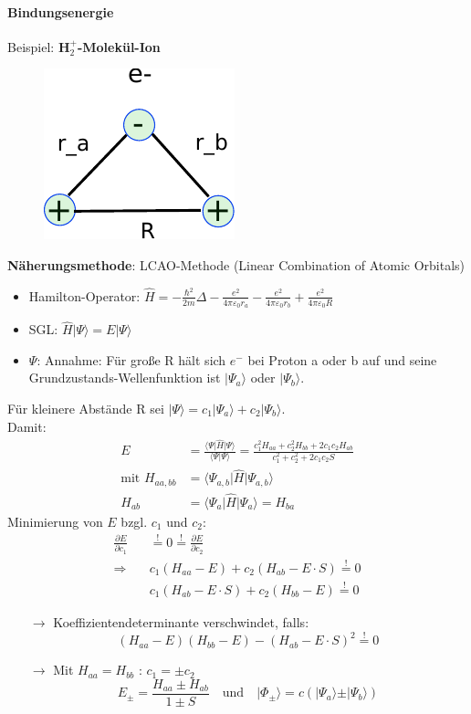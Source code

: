 \paragraph{Bindungsenergie}
Beispiel: \textbf{H$_2^+$-Molekül-Ion}
\begin{figure}[H]
	\centering
	\includegraphics{figures/1_4WasserstoffH2O.pdf}
	\caption{}
	\label{}
\end{figure}
\textbf{Näherungsmethode}: LCAO-Methode (Linear Combination of Atomic Orbitals)
\begin{itemize}
	\item Hamilton-Operator: $\hat H = - \frac{\hbar^2}{2m} \Delta - \frac{e^2}{4 \pi \varepsilon_0 r_a} - \frac{e^2}{4 \pi \varepsilon_0 r_b} +\frac{e^2}{4 \pi \varepsilon_0 R}$
	\item SGL: $\hat H \vert\Psi\rangle = E \vert\Psi\rangle$
	\item $\Psi$: Annahme: Für große R hält sich $e^-$ bei Proton a oder b auf und seine Grundzustands-Wellenfunktion ist $\vert\Psi_a\rangle$ oder $\vert\Psi_b\rangle$.\\
\end{itemize}
Für kleinere Abstände R sei $\vert\Psi\rangle = c_1 \vert\Psi_a\rangle + c_2 \vert\Psi_b\rangle$. \\
Damit:
\begin{align*}
	E &= \frac{\langle\Psi\vert\hat{H}\vert\Psi\rangle}{\langle\Psi\vert\Psi\rangle} = \frac{c_1^2 H_{aa} + c_2^2 H_{bb} + 2 c_1 c_2 H_{ab}}{c_1^2 + c_2^2 + 2 c_1 c_2 S}\\
	\text{mit } H_{aa,bb} &= \langle\Psi_{a,b}\vert\hat{H}\vert\Psi_{a,b}\rangle\\  
	H_{ab} &= \langle\Psi_a\vert\hat{H}\vert\Psi_a\rangle = H_{ba}
\end{align*}
Minimierung von $E$ bzgl. $c_1$ und $c_2$:
\begin{align*}
	\frac{\partial E}{\partial c_1} &\stackrel{!}{=} 0 \stackrel{!}{=} \frac{\partial E}{\partial c_2}\\
	\Rightarrow \quad &c_1(H_{aa}-E)+c_2(H_{ab}-E\cdot S) \stackrel{!}{=} 0\\
	&c_1(H_{ab}-E\cdot S)+c_2(H_{bb}-E) \stackrel{!}{=} 0
\end{align*}
\begin{itemize}
	\item[$\rightarrow$] Koeffizientendeterminante verschwindet, falls:
	$$ (H_{aa}-E)(H_{bb}-E) - (H_{ab}-E \cdot S)^2 \stackrel{!}{=} 0 $$
	\item[$\rightarrow$] Mit $H_{aa} = H_{bb}$ : $c_1 = \pm c_2 $
	$$E_{\pm} = \frac{H_{aa} \pm H_{ab}}{1 \pm S} \quad \text{und} \quad \vert\Phi_{\pm}\rangle = c (\vert\Psi_a\rangle \pm \vert\Psi_b\rangle) $$
\end{itemize}
